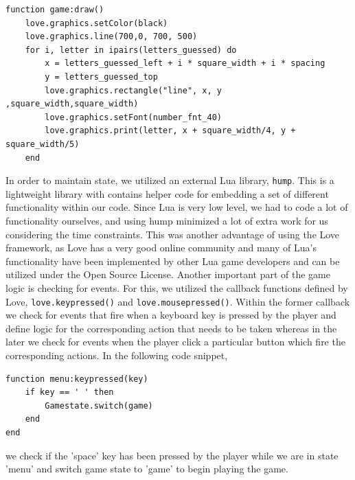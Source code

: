 \noindent\begin{minipage}[t]{\textwidth}
\begin{lstlisting}[language={[5.2]Lua}, %
  title={Game State}, label=game]
	function game:draw()
    love.graphics.setColor(black)
    love.graphics.line(700,0, 700, 500)
    for i, letter in ipairs(letters_guessed) do
        x = letters_guessed_left + i * square_width + i * spacing
        y = letters_guessed_top
        love.graphics.rectangle("line", x, y ,square_width,square_width)
        love.graphics.setFont(number_fnt_40)
        love.graphics.print(letter, x + square_width/4, y + square_width/5)
    end

\end{lstlisting}
\end{minipage}

In order to maintain state, we utilized an external Lua library, \texttt{hump}. This is a lightweight library with contains helper code for embedding a set of different functionality within our code. Since Lua is very low level, we had to code a lot of functionality ourselves, and using hump minimized a lot of extra work for us considering the time constraints. This was another advantage of using the Love framework, as Love has a very good online community and many of Lua's functionality have been implemented by other Lua game developers and can be utilized under the Open Source License.
Another important part of the game logic is checking for events. For this, we utilized the callback functions defined by Love, \texttt{love.keypressed()} and \texttt{love.mousepressed()}. Within the former callback we check for events that fire when a keyboard key is pressed by the player and define logic for the corresponding action that needs to be taken whereas in the later we check for events when the player click a particular button which fire the corresponding actions. In the following code snippet,
	
\noindent\begin{minipage}[t]{\textwidth}
\begin{lstlisting}[language={[5.2]Lua}, %
  title={Keypressed Event}, label=keypressed]
	function menu:keypressed(key)
    if key == ' ' then
        Gamestate.switch(game)
    end
end
\end{lstlisting}
\end{minipage}
we check if the 'space' key has been pressed by the player while we are in state 'menu' and switch game state to 'game' to begin playing the game.
